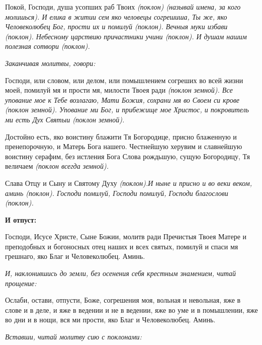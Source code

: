 Покой, Господи, душа усопших раб Твоих \itshape (поклон) (называй имена, за кого молишься)\normalfont{}. И елика в житии сем яко человецы согрешиша, Ты же, яко Человеколюбец Бог, прости их и помилуй (поклон). Вечныя муки избави \itshape (поклон)\normalfont{}. Небесному царствию причастники учини \itshape (поклон)\normalfont{}. И душам нашим полезная сотвори \itshape (поклон)\normalfont{}.


\medskip


\itshape Заканчивая молитвы, говори: \normalfont{}


Господи, или словом, или делом, или помышлением согреших во всей жизни моей, помилуй мя и прости мя, милости Твоея ради \itshape (поклон земной)\normalfont{}. Все упование мое к Тебе возлагаю, Мати Божия, сохрани мя во Своем си крове \itshape (поклон земной)\normalfont{}. Упование ми Бог, и прибежище мое Христос, и покровитель ми есть Дух Святыи \itshape (поклон земной)\normalfont{}.


Достойно есть, яко воистину блажити Тя Богородице, присно блаженную и пренепорочную, и Матерь Бога нашего. Честнейшую херувим и славнейшую воистину серафим, без истления Бога Слова рождьшую, сущую Богородицу, Тя величаем \itshape (поклон всегда земной)\normalfont{}.


Слава Отцу и Сыну и Святому Духу \itshape (поклон)\normalfont{}.И ныне и присно и во веки веком, аминь \itshape (поклон)\normalfont{}. Господи помилуй, Господи помилуй, Господи благослови \itshape (поклон)\normalfont{}. 


\medskip


\bfseries И отпуст:\normalfont{}


Господи, Исусе Христе, Сыне Божии, молитв ради Пречистыя Твоея Матере и преподобных и богоносных отец наших и всех святых, помилуй и спаси мя грешнаго, яко Благ и Человеколюбец. Аминь.


\medskip


\itshape И, наклонившись до земли, без осенения себя крестным знамением, читай прощение: \normalfont{}


Ослаби, остави, отпусти, Боже, согрешения моя, вольная и невольная, яже в слове и в деле, и яже в ведении и не в ведении, яже во уме и в помышлении, яже во дни и в нощи, вся ми прости, яко Благ и Человеколюбец. Аминь. 


\medskip


\itshape Вставши, читай молитву сию с поклонами:\normalfont{}


